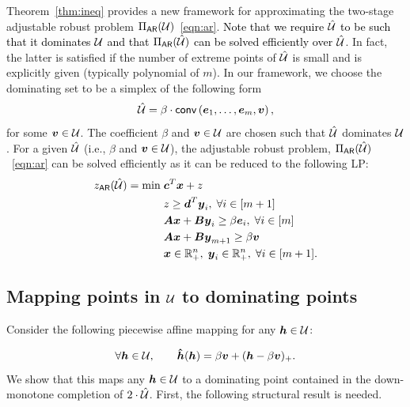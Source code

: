 \documentclass[11pt]{article}
\theoremstyle{plain}
\theoremstyle{definition}
\numberwithin{equation}{section}%
\numberwithin{equation}{section}%
\newcommand{\mb}[1]{\ensuremath{\boldsymbol{#1}}}
\newcommand*{\red}{\textcolor{black}}
\begin{document}
Theorem~\ref{thm:ineq} provides a new framework for approximating the two-stage adjustable robust problem $\Pi_{\sf AR}(\cal U)$~\eqref{eqn:ar}. \red{Note that we require  $\hat{\cal U}$ to be such that it dominates ${\cal U}$ and that $\Pi_{\sf AR}(\hat{\cal U})$ can be solved efficiently over $\hat{\cal U}$}. In fact, the latter is satisfied if the number of extreme points of $\hat{\cal U}$ is small and is explicitly given (typically polynomial of $m$). In our framework, we choose the dominating set to be a simplex of the following form
\begin{equation}\label{eq:simplex}
\hat{\cal U} = \beta \cdot {\sf conv } \left( \mb e_1,\ldots,\mb e_m, \mb v \right),
\end{equation}
for some $ \mb v \in {\cal U}$. The coefficient $\beta$ and $\mb{v} \in {\cal U}$ are chosen such that $\hat {\cal U}$ dominates $ {\cal U }$. %
For a given $\hat{\cal U}$ (i.e.,  $\beta$ and $\mb v \in {\cal U}$), the adjustable robust problem, $\Pi_{\sf AR}(\hat{\cal U})$~\eqref{eqn:ar} can be solved efficiently as it can be reduced to the following LP:
\[\begin{aligned}
z_{\sf AR}(\hat{\cal U}) = \min  \;& \mb{c}^T\mb{x}+z \\
& z\geq\mb{d}^T\mb{y}_i,\;\forall i\in[m+1] \\
& \mb{A}\mb{x}+\mb{B}\mb{y}_i\geq \beta \mb{e}_i,\;\forall i\in[m] \\
& \mb{A}\mb{x}+\mb{B}\mb{y}_{m+1}\geq \beta \mb v \\
& \mb{x}\in {\mathbb R}^{n}_+, \;  \mb{y}_i\in{\mathbb R}^{n}_+, \;\forall i\in[m+1] .\\
\end{aligned}\]


\subsection{Mapping points in ${\cal U}$ to dominating points }

Consider the following  piecewise affine mapping for any  $\mb h \in {\cal U}$:

\begin{equation} \label{eq:mapping}
\forall \mb h \in {\cal U}, \qquad \mb{ \hat{h}}(\mb h) = \beta \mb v + ( \mb h - \beta \mb v )_+.
\end{equation}
We show that this maps any $\mb h \in {\cal U}$ to a dominating point contained in the down-monotone completion of $2 \cdot \hat{\cal U}$. First, the following structural result is needed.
\end{document}
